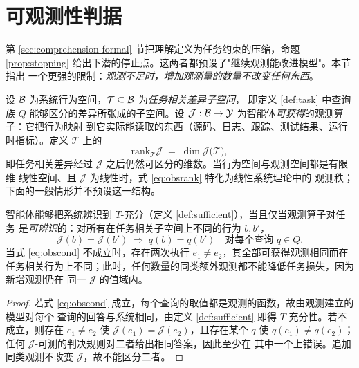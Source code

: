 \section{可观测性判据}\label{sec:observability}

第 \ref{sec:comprehension-formal} 节把理解定义为任务约束的压缩，命题
\ref{prop:stopping} 给出下潜的停止点。这两者都预设了"继续观测能改进模型"。本节指出
一个更强的限制：\emph{观测不足时，增加观测量的数量不改变任何东西}。

\begin{definition}[观测算子与任务子空间]\label{def:observability}
设 $\mathcal{B}$ 为系统行为空间，$\mathcal{T} \subseteq \mathcal{B}$ 为\emph{任务相关差异子空间}，
即定义 \ref{def:task} 中查询族 $Q$ 能够区分的差异所张成的子空间。设
$\mathcal{J} : \mathcal{B} \to \mathcal{Y}$ 为智能体\emph{可获得}的观测算子：它把行为映射
到它实际能读取的东西（源码、日志、跟踪、测试结果、运行时指标）。定义
$\mathcal{T}$ 上的
\begin{equation}\label{eq:obsrank}
\mathrm{rank}_{\mathcal{T}}\mathcal{J} \;=\;
\dim \mathcal{J}\bigl(\mathcal{T}\bigr),
\end{equation}
即任务相关差异经过 $\mathcal{J}$ 之后仍然可区分的维数。当行为空间与观测空间都是有限维
线性空间、且 $\mathcal{J}$ 为线性时，式 \eqref{eq:obsrank} 特化为线性系统理论中的
观测秩\cite{kalman1960}；下面的一般情形并不预设这一结构。
\end{definition}

\begin{proposition}[可观测性判据]\label{prop:observability}
智能体能够把系统辨识到 $T$-充分（定义 \ref{def:sufficient}），当且仅当观测算子对任务
是\emph{可辨识}的：对所有在任务相关子空间上不同的行为 $b, b'$，
\begin{equation}\label{eq:obscond}
\mathcal{J}(b) = \mathcal{J}(b') \;\Longrightarrow\; q(b) = q(b') \quad \text{对每个查询 } q \in Q .
\end{equation}
当式 \eqref{eq:obscond} 不成立时，存在两次执行 $e_1 \ne e_2$，其全部可获得观测相同而在
任务相关行为上不同；此时，任何数量的同类额外观测都不能降低任务损失，因为新增观测仍在
同一 $\mathcal{J}$ 的值域内。
\end{proposition}

\begin{proof}
若式 \eqref{eq:obscond} 成立，每个查询的取值都是观测的函数，故由观测建立的模型对每个
查询的回答与系统相同，由定义 \ref{def:sufficient} 即得 $T$-充分性。若不成立，则存在
$e_1 \ne e_2$ 使 $\mathcal{J}(e_1) = \mathcal{J}(e_2)$，且存在某个 $q$ 使
$q(e_1) \ne q(e_2)$；任何 $\mathcal{J}$-可测的判决规则对二者给出相同答案，因此至少在
其中一个上错误。追加同类观测不改变 $\mathcal{J}$，故不能区分二者。
\end{proof}

